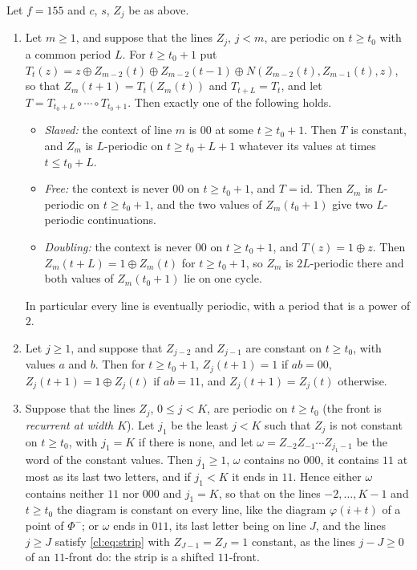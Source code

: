 \begin{lemma}\label{cl:lem:155strip}
Let $f=155$ and $c$, $s$, $Z_j$ be as above.
\begin{enumerate}
\item[(i)] Let $m\ge1$, and suppose that the lines $Z_j$, $j<m$, are periodic on $t\ge t_0$ with a common period $L$. For $t\ge t_0+1$ put $T_t(z)=z\oplus Z_{m-2}(t)\oplus Z_{m-2}(t-1)\oplus N(Z_{m-2}(t),Z_{m-1}(t),z)$, so that $Z_m(t+1)=T_t(Z_m(t))$ and $T_{t+L}=T_t$, and let $T=T_{t_0+L}\circ\cdots\circ T_{t_0+1}$. Then exactly one of the following holds.
\begin{itemize}
\item \emph{Slaved:} the context of line $m$ is $00$ at some $t\ge t_0+1$. Then $T$ is constant, and $Z_m$ is $L$-periodic on $t\ge t_0+L+1$ whatever its values at times $t\le t_0+L$.
\item \emph{Free:} the context is never $00$ on $t\ge t_0+1$, and $T=\mathrm{id}$. Then $Z_m$ is $L$-periodic on $t\ge t_0+1$, and the two values of $Z_m(t_0+1)$ give two $L$-periodic continuations.
\item \emph{Doubling:} the context is never $00$ on $t\ge t_0+1$, and $T(z)=1\oplus z$. Then $Z_m(t+L)=1\oplus Z_m(t)$ for $t\ge t_0+1$, so $Z_m$ is $2L$-periodic there and both values of $Z_m(t_0+1)$ lie on one cycle.
\end{itemize}
In particular every line is eventually periodic, with a period that is a power of $2$.
\item[(ii)] Let $j\ge1$, and suppose that $Z_{j-2}$ and $Z_{j-1}$ are constant on $t\ge t_0$, with values $a$ and $b$. Then for $t\ge t_0+1$, $Z_j(t+1)=1$ if $ab=00$, $Z_j(t+1)=1\oplus Z_j(t)$ if $ab=11$, and $Z_j(t+1)=Z_j(t)$ otherwise.
\item[(iii)] Suppose that the lines $Z_j$, $0\le j<K$, are periodic on $t\ge t_0$ (the front is \emph{recurrent at width $K$}). Let $j_1$ be the least $j<K$ such that $Z_j$ is not constant on $t\ge t_0$, with $j_1=K$ if there is none, and let $\omega=Z_{-2}Z_{-1}\cdots Z_{j_1-1}$ be the word of the constant values. Then $j_1\ge1$, $\omega$ contains no $000$, it contains $11$ at most as its last two letters, and if $j_1<K$ it ends in $11$. Hence either $\omega$ contains neither $11$ nor $000$ and $j_1=K$, so that on the lines $-2,\dots,K-1$ and $t\ge t_0$ the diagram is constant on every line, like the diagram $\varphi(i+t)$ of a point of $\Phi^-$; or $\omega$ ends in $011$, its last letter being on line $J$, and the lines $j\ge J$ satisfy \eqref{cl:eq:strip} with $Z_{J-1}=Z_J=1$ constant, as the lines $j-J\ge0$ of an $11$-front do: the strip is a shifted $11$-front.
\end{enumerate}
\end{lemma}

